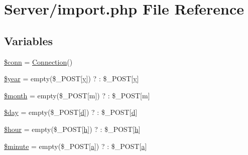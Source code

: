 \hypertarget{import_8php}{}\section{Server/import.php File Reference}
\label{import_8php}
\subsection*{Variables}
\begin{DoxyCompactItemize}
\item 
\hyperlink{import_8php_aa8a5a87b9c1a6a0819b88447cbe41877}{\$conn} = \hyperlink{connect_8php_a346f4774f29e17e14e9b39fa9e2165e3}{Connection}()
\item 
\hyperlink{import_8php_a8e992d901ac2312b3be2021ddbb7d11e}{\$year} = empty(\$\+\_\+\+P\+O\+ST\mbox{[}\textquotesingle{}\hyperlink{_w_s_8ino_a671dd85f94413cb1d3f4fa1877dded70}{y}\textquotesingle{}\mbox{]}) ? \textquotesingle{}\textquotesingle{} \+: \$\+\_\+\+P\+O\+ST\mbox{[}\textquotesingle{}\hyperlink{_w_s_8ino_a671dd85f94413cb1d3f4fa1877dded70}{y}\textquotesingle{}\mbox{]}
\item 
\hyperlink{import_8php_a6ba6e82c39e80d5d00afeb6f4383a549}{\$month} = empty(\$\+\_\+\+P\+O\+ST\mbox{[}\textquotesingle{}m\textquotesingle{}\mbox{]}) ? \textquotesingle{}\textquotesingle{} \+: \$\+\_\+\+P\+O\+ST\mbox{[}\textquotesingle{}m\textquotesingle{}\mbox{]}
\item 
\hyperlink{import_8php_a4db742f2faa33cdbae6722a11051f3bd}{\$day} = empty(\$\+\_\+\+P\+O\+ST\mbox{[}\textquotesingle{}\hyperlink{_w_s_8ino_a7e3f4a5179b8e7fc0d3cee2a12bb3f44}{d}\textquotesingle{}\mbox{]}) ? \textquotesingle{}\textquotesingle{} \+: \$\+\_\+\+P\+O\+ST\mbox{[}\textquotesingle{}\hyperlink{_w_s_8ino_a7e3f4a5179b8e7fc0d3cee2a12bb3f44}{d}\textquotesingle{}\mbox{]}
\item 
\hyperlink{import_8php_a54248578d000a0f9808d29c20ed18b38}{\$hour} = empty(\$\+\_\+\+P\+O\+ST\mbox{[}\textquotesingle{}\hyperlink{_w_s_8ino_a5977e838367785a7176dc7d4106df5e3}{h}\textquotesingle{}\mbox{]}) ? \textquotesingle{}\textquotesingle{} \+: \$\+\_\+\+P\+O\+ST\mbox{[}\textquotesingle{}\hyperlink{_w_s_8ino_a5977e838367785a7176dc7d4106df5e3}{h}\textquotesingle{}\mbox{]}
\item 
\hyperlink{import_8php_a08355553540e06b50acd4138d6254fd0}{\$minute} = empty(\$\+\_\+\+P\+O\+ST\mbox{[}\textquotesingle{}\hyperlink{_w_s_8ino_aa4c2a5552e9bc49b1816ff532f558c74}{a}\textquotesingle{}\mbox{]}) ? \textquotesingle{}\textquotesingle{} \+: \$\+\_\+\+P\+O\+ST\mbox{[}\textquotesingle{}\hyperlink{_w_s_8ino_aa4c2a5552e9bc49b1816ff532f558c74}{a}\textquotesingle{}\mbox{]}

\end{DoxyCompactItemize}
